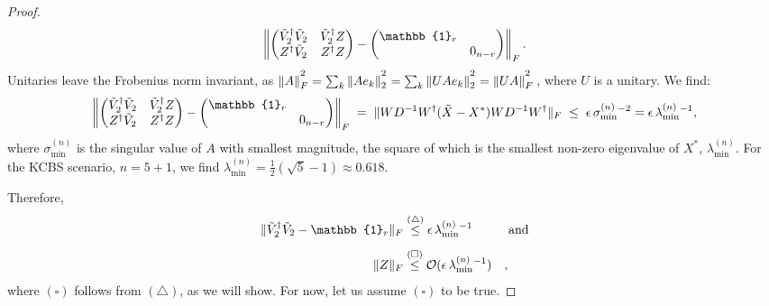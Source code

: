 \begin{proof}
\begin{equation*}
\left\|
\begin{pmatrix}
\Tilde{V}_2^{\dag}\Tilde{V}_2 & \Tilde{V}_2^{\dag} Z \\
Z^{\dag}\Tilde{V}_2 & Z^{\dag}Z
\end{pmatrix}
-
\begin{pmatrix}
\mathbb{1}_r & \\
& 0_{n-r}
\end{pmatrix}
\right\|_F.
\end{equation*}
Unitaries leave the Frobenius norm invariant, as $\|A\|_F^{\textstyle ^2}=\sum_k\|Ae_k\|_2^{\textstyle ^2} = \sum_k \|UAe_k\|_2^{\textstyle ^2}=\|UA\|_F^{\textstyle ^2}\thinspace$, where $U$ is a unitary. We find:
\begin{equation*}
\left\|
\begin{pmatrix}
\Tilde{V}_2^{\dag}\Tilde{V}_2 & \Tilde{V}_2^{\dag} Z \\
Z^{\dag}\Tilde{V}_2 & Z^{\dag}Z
\end{pmatrix}
-
\begin{pmatrix}
\mathbb{1}_r & \\
& 0_{n-r}
\end{pmatrix}
\right\|_F\;=\;\|WD^{-1}W^{\dag}(\Tilde{X}-X^*)WD^{-1}W^{\dag}\|_F\; \leq\; \epsilon\thinspace\sigma_{\text{min}}^{(n)}{}^{-2}=\epsilon\thinspace\lambda_{\text{min}}^{(n)}{}^{-1},
\end{equation*}
where $\sigma_{\text{min}}^{(n)}$ is the singular value of $A$ with smallest magnitude, the square of which is the smallest non-zero eigenvalue of $X^*$, $\lambda_{\text{min}}^{(n)}$.
For the KCBS scenario, $n=5+1$, we find $\lambda_{\text{min}}^{(n)}=\frac{1}{2}(\sqrt{5}-1)\approx 0.618$.

Therefore,
\begin{alignat*}{2}
\|\Tilde{V}_2^{\dag}\Tilde{V}_2-\mathbb{1}_r\|_F & \stackrel{(\triangle)}{\leq}\epsilon\thinspace \lambda_{\text{min}}^{(n)}{}^{-1} && \text{ and}\\[0.5em]
\|Z\|_F & \stackrel{(\square)}{\leq}\mathcal{O}(\epsilon\thinspace\lambda_{\text{min}}^{(n)}{}^{-1})&&,
\end{alignat*}
where $(\square)$ follows from $(\triangle)$, as we will show. For now, let us assume $(\square)$ to be true.


\end{proof}
